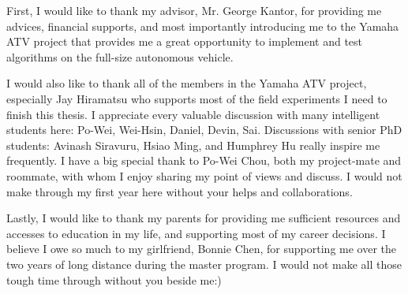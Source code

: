\documentclass[hidelinks, 12pt]{cmuthesis}
\begin{document}
\begin{acknowledgments}

First, I would like to thank my advisor, Mr. George Kantor, for providing me advices, financial supports, and most importantly introducing me to the Yamaha ATV project that provides me a great opportunity to implement and test algorithms on the full-size autonomous vehicle.

I would also like to thank all of the members in the Yamaha ATV project, especially Jay Hiramatsu who supports most of the field experiments I need to finish this thesis. I appreciate every valuable discussion with many intelligent students here: Po-Wei, Wei-Hsin, Daniel, Devin, Sai. Discussions with senior PhD students: Avinash Siravuru, Hsiao Ming, and Humphrey Hu really inspire me frequently. 
I have a big special thank to Po-Wei Chou, both my project-mate and roommate, with whom I enjoy sharing my point of views and discuss. 
I would not make through my first year here without your helps and collaborations.

Lastly, I would like to thank my parents for providing me sufficient resources and accesses to education in my life, and supporting most of my career decisions. I believe I owe so much to my girlfriend, Bonnie Chen, for supporting me over the two years of long distance during the master program. I would not make all those tough time through without you beside me:)

  


\end{acknowledgments}
\end{document}
